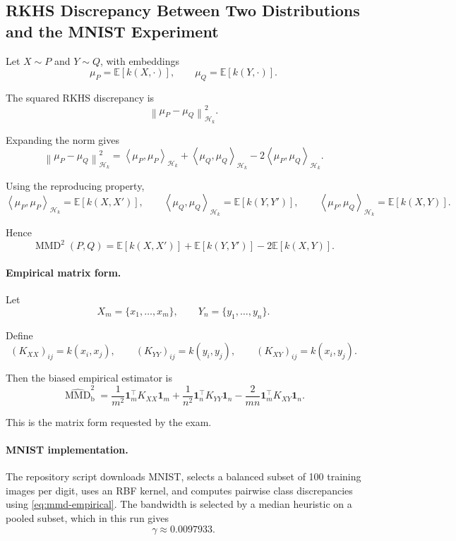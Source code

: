 \documentclass[11pt]{article}
\newcommand{\E}{\mathbb{E}}
\newcommand{\MMD}{\operatorname{MMD}}
\newcommand{\norm}[1]{\left\lVert #1 \right\rVert}
\newcommand{\inner}[2]{\left\langle #1, #2 \right\rangle}
\newcommand{\transpose}{^{\top}}
\begin{document}
\subsection{RKHS Discrepancy Between Two Distributions and the MNIST Experiment}

Let $X \sim P$ and $Y \sim Q$, with embeddings
\[
\mu_P = \E[k(X,\cdot)],
\qquad
\mu_Q = \E[k(Y,\cdot)].
\]

The squared RKHS discrepancy is
\[
\norm{\mu_P - \mu_Q}_{\mathcal{H}_k}^2.
\]

Expanding the norm gives
\[
\norm{\mu_P - \mu_Q}_{\mathcal{H}_k}^2
=
\inner{\mu_P}{\mu_P}_{\mathcal{H}_k}
+
\inner{\mu_Q}{\mu_Q}_{\mathcal{H}_k}
- 2\inner{\mu_P}{\mu_Q}_{\mathcal{H}_k}.
\]

Using the reproducing property,
\[
\inner{\mu_P}{\mu_P}_{\mathcal{H}_k} = \E[k(X,X')],
\qquad
\inner{\mu_Q}{\mu_Q}_{\mathcal{H}_k} = \E[k(Y,Y')],
\qquad
\inner{\mu_P}{\mu_Q}_{\mathcal{H}_k} = \E[k(X,Y)].
\]

Hence
\begin{equation}
\MMD^2(P,Q)
=
\E[k(X,X')]
+
\E[k(Y,Y')]
- 2\E[k(X,Y)].
\label{eq:mmd-population}
\end{equation}

\paragraph{Empirical matrix form.}
Let
\[
X_m = \{x_1,\dots,x_m\},
\qquad
Y_n = \{y_1,\dots,y_n\}.
\]

Define
\[
(K_{XX})_{ij} = k(x_i,x_j),
\qquad
(K_{YY})_{ij} = k(y_i,y_j),
\qquad
(K_{XY})_{ij} = k(x_i,y_j).
\]

Then the biased empirical estimator is
\begin{equation}
\widehat{\MMD}_{\mathrm{b}}^2
=
\frac{1}{m^2}\bm{1}_m\transpose K_{XX}\bm{1}_m
+
\frac{1}{n^2}\bm{1}_n\transpose K_{YY}\bm{1}_n
- \frac{2}{mn}\bm{1}_m\transpose K_{XY}\bm{1}_n.
\label{eq:mmd-empirical}
\end{equation}

This is the matrix form requested by the exam.

\paragraph{MNIST implementation.}
The repository script downloads MNIST, selects a balanced subset of 100 training images per digit, uses an RBF kernel, and computes pairwise class discrepancies using \eqref{eq:mmd-empirical}. The bandwidth is selected by a median heuristic on a pooled subset, which in this run gives
\[
\gamma \approx 0.0097933.
\]
\end{document}
